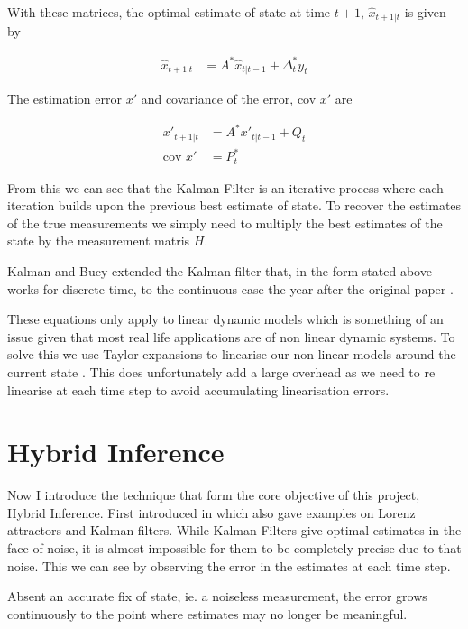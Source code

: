 \documentclass[]{../resources/final_report}
\begin{document}
With these matrices, the optimal estimate of state at time $t+1$, $\hat{x}_{t+1|t}$ is given by 

\begin{align}
  \hat{x}_{t+1|t} &= A^*\hat{x}_{t|t-1} + \Delta^*_ty_t
\end{align}

The estimation error $x'$ and covariance of the error, cov $x'$ are

\begin{align}
  x'_{t+1|t} &= A^*x'_{t|t-1} + Q_t \\
  \text{cov } x' &= P^*_t
\end{align}

From this we can see that the Kalman Filter is an iterative process where each iteration builds upon 
the previous best estimate of state. To recover the estimates of the true measurements we simply 
need to multiply the best estimates of the state by the measurement matris $H$.

Kalman and Bucy extended the Kalman filter that, in the form stated above works for discrete time, to the 
continuous case the year after the original paper \cite{Klmn1961NewRI}.

These equations only apply to linear dynamic models which is something of an issue given that most 
real life applications are of non linear dynamic systems. To solve this we use Taylor expansions to 
linearise our non-linear models around the current state \cite{ExtendedKalmanNasa}. This does 
unfortunately add a large overhead as we need to re linearise at each time step to avoid 
accumulating linearisation errors.

\section{Hybrid Inference}

Now I introduce the technique that form the core objective of this project, Hybrid Inference. First 
introduced in \cite{Satorras2019CombiningGA} which also gave examples on Lorenz attractors and 
Kalman filters. While Kalman Filters give optimal estimates in the face of noise, it is almost 
impossible for them to be completely precise due to that noise. This we can see by observing the 
error in the estimates at each time step.

Absent an accurate fix of state, ie. a noiseless measurement, the error grows 
continuously to the point where estimates may no longer be meaningful.
\end{document}
